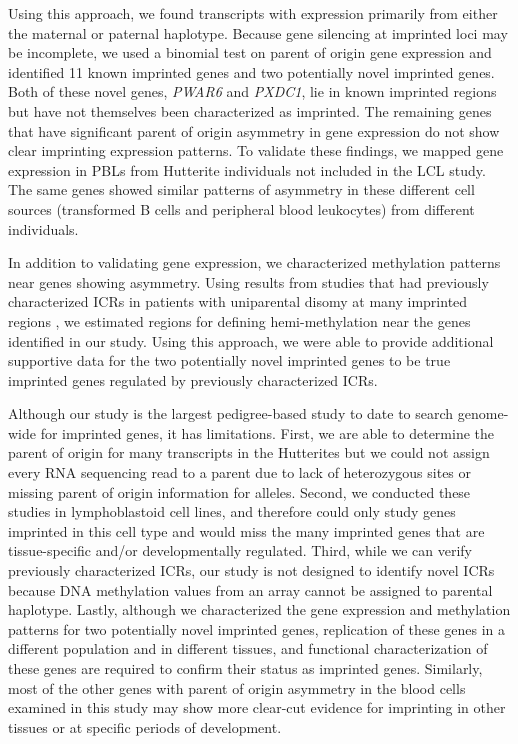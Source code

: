 Using this approach, we found transcripts with expression primarily from either the maternal or paternal haplotype. Because gene silencing at imprinted loci may be incomplete, we used a binomial test on parent of origin gene expression and identified 11 known imprinted genes and two potentially novel imprinted genes. Both of these novel genes, \emph{PWAR6} and \emph{PXDC1}, lie in known imprinted regions but have not themselves been characterized as imprinted. The remaining genes that have significant parent of origin asymmetry in gene expression do not show clear imprinting expression patterns. To validate these findings, we mapped gene expression in PBLs from Hutterite individuals not included in the LCL study. The same genes showed similar patterns of asymmetry in these different cell sources (transformed B cells and peripheral blood leukocytes) from different individuals.

In addition to validating gene expression, we characterized methylation patterns near genes showing asymmetry. Using results from studies that had previously characterized ICRs in patients with uniparental disomy at many imprinted regions \citep{Joshi:2016bb, Court:2014kc}, we estimated regions for defining hemi-methylation near the genes identified in our study. Using this approach, we were able to provide additional supportive data for the two potentially novel imprinted genes to be true imprinted genes regulated by previously characterized ICRs. 

Although our study is the largest pedigree-based study to date to search genome-wide for imprinted genes, it has limitations. First, we are able to determine the parent of origin for many transcripts in the Hutterites but we could not assign every RNA sequencing read to a parent due to lack of heterozygous sites or missing parent of origin information for alleles. Second, we conducted these studies in lymphoblastoid cell lines, and therefore could only study genes imprinted in this cell type and would miss the many imprinted genes that are tissue-specific and/or developmentally regulated. Third, while we can verify previously characterized ICRs, our study is not designed to identify novel ICRs because DNA methylation values from an array cannot be assigned to parental haplotype. Lastly, although we characterized the gene expression and methylation patterns for two potentially novel imprinted genes, replication of these genes in a different population and in different tissues, and functional characterization of these genes are required to confirm their status as imprinted genes. Similarly, most of the other genes with parent of origin asymmetry in the blood cells examined in this study may show more clear-cut evidence for imprinting in other tissues or at specific periods of development.  

